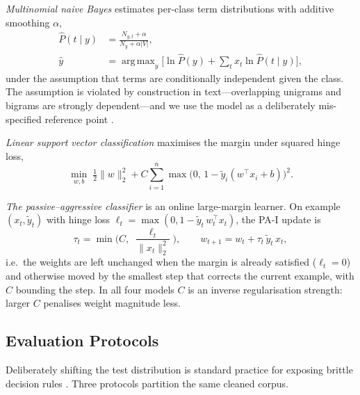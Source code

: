 \documentclass[conference]{IEEEtran}
\DeclareMathOperator*{\argmax}{arg\,max}
\begin{document}
\emph{Multinomial naive Bayes} \cite{mccallum1998comparison} estimates
per-class term distributions with additive smoothing $\alpha$,
\begin{equation}
\begin{split}
  \hat{P}(t\mid y) &= \frac{N_{y,t}+\alpha}{N_{y}+\alpha|V|},\\[2pt]
  \hat{y} &= \argmax_{y}\Big[\ln \hat{P}(y)
             + \sum_{t} x_{t}\ln\hat{P}(t\mid y)\Big],
\end{split}
  \label{eq:nb}
\end{equation}
under the assumption that terms are conditionally independent given the class.
The assumption is violated by construction in text---overlapping unigrams and
bigrams are strongly dependent---and we use the model as a deliberately
mis-specified reference point \cite{domingos1997optimality,rennie2003tackling}.

\emph{Linear support vector classification} \cite{cortes1995support,joachims1998text}
maximises the margin under squared hinge loss,
\begin{equation}
  \min_{w,b}\;\tfrac{1}{2}\lVert w\rVert_2^2
  + C\sum_{i=1}^{n}\max\!\big(0,\,1-\tilde{y}_i(w^{\!\top}x_i+b)\big)^{2}.
  \label{eq:svm}
\end{equation}

\emph{The passive--aggressive classifier} \cite{crammer2006online} is an online
large-margin learner. On example $(x_t,\tilde{y}_t)$ with hinge loss
$\ell_t=\max(0,1-\tilde{y}_t\,w_t^{\!\top}x_t)$, the PA-I update is
\begin{equation}
  \tau_t=\min\!\Big(C,\;\frac{\ell_t}{\lVert x_t\rVert_2^{2}}\Big),
  \qquad
  w_{t+1}=w_t+\tau_t\,\tilde{y}_t\,x_t,
  \label{eq:pa}
\end{equation}
i.e.\ the weights are left unchanged when the margin is already satisfied
($\ell_t=0$) and otherwise moved by the smallest step that corrects the current
example, with $C$ bounding the step. In all four models $C$ is an inverse
regularisation strength: larger $C$ penalises weight magnitude less.

\subsection{Evaluation Protocols}
\label{sec:method-protocols}
Deliberately shifting the test distribution is standard practice for exposing
brittle decision rules \cite{quinonero2009dataset,koh2021wilds}. Three
protocols partition the same cleaned corpus.
\end{document}
